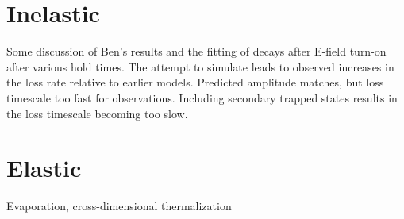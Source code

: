 \section{Inelastic}

Some discussion of Ben's results and the fitting of decays after E-field turn-on after various hold times.
The attempt to simulate leads to observed increases in the loss rate relative to earlier models.
Predicted amplitude matches, but loss timescale too fast for observations.
Including secondary trapped states results in the loss timescale becoming too slow.

\section{Elastic}

Evaporation, cross-dimensional thermalization



\ifx\justbeingincluded\undefined

\fi
